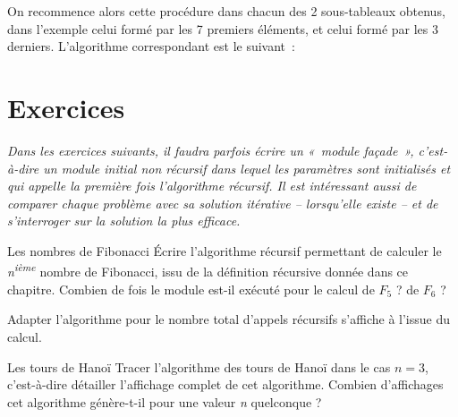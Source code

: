 		On recommence alors cette procédure dans chacun des 2 sous-tableaux 
		obtenus, dans l'exemple celui formé par les 7 premiers éléments, 
		et celui formé par les 3 derniers. L'algorithme correspondant est 
		le suivant~:


\section{Exercices}

	{\itshape
	Dans les exercices suivants, il faudra parfois écrire un 
	«~module façade~», c'est-à-dire un module initial non récursif
	dans lequel les paramètres sont initialisés et qui appelle 
	la première fois l'algorithme récursif. Il est intéressant
	aussi de comparer chaque problème avec sa solution itérative 
	-- lorsqu'elle existe -- et de s'interroger sur la
	solution la plus efficace.}

	\begin{Exercice}{Les nombres de Fibonacci}
		Écrire l'algorithme récursif permettant de calculer le 
		\textit{n\textsuperscript{ième}} nombre de Fibonacci, 
		issu de la définition récursive donnée dans ce chapitre. 
		Combien de fois le module est-il exécuté pour le calcul de
		$F_5$ ? de $F_6$ ?

		Adapter l'algorithme pour le nombre total d'appels récursifs 
		s'affiche à l'issue du calcul.

	\end{Exercice}
	
	\begin{Exercice}{Les tours de Hanoï}
		Tracer l'algorithme des tours de Hanoï dans le cas 
		$n = 3$, c'est-à-dire détailler l'affichage complet de cet
		algorithme. Combien d'affichages cet algorithme génère-t-il 
		pour une valeur \textit{n} quelconque ?
	\end{Exercice}
	
